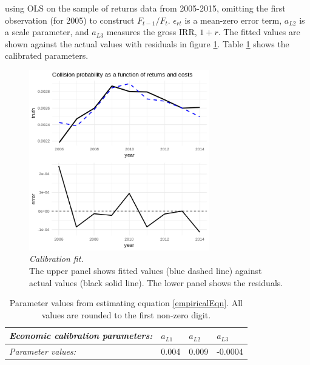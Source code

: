 \documentclass[12pt]{article}
\begin{document}
using OLS on the sample of returns data from 2005-2015, omitting the first observation (for 2005) to construct $F_{t-1}/F_{t}$. $\epsilon_{rt}$ is a mean-zero error term, $a_{L 2}$ is a scale parameter, and $a_{L 3}$ measures the gross IRR, $1+r$. The fitted values are shown against the actual values with residuals in figure \ref{econCalibration}. Table \ref{econParms} shows the calibrated parameters. %

\begin{figure}
	\centering
	\includegraphics[width=0.7\textwidth]{../../images/risk_return_plot.png}
	\captionsetup{format=hang}
	\caption[Open access equilibrium condition model fit]{\textit{Calibration fit.} \\
		The upper panel shows fitted values (blue dashed line) against actual values (black solid line). The lower panel shows the residuals.
	}
	\label{econCalibration}
\end{figure}


\begin{table}[H]
	\centering
	\begin{tabular}{|l|l|l|l|}
		\hline
		\textit{Economic calibration parameters:}      & \textbf{$a_{L 1}$} & \textbf{$a_{L 2}$} & \textbf{$a_{L 3}$} \\ \hline
		\textit{Parameter values:} & 0.004               & 0.009               & -0.0004 \\ \hline
	\end{tabular}
	\caption[Parameter values from estimating equation \ref{empiricalEqn}]{Parameter values from estimating equation \ref{empiricalEqn}. All values are rounded to the first non-zero digit.}
	\label{econParms}
\end{table}
\end{document}

